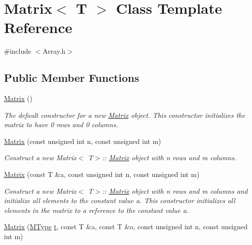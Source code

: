 \hypertarget{classMatrix}{}\section{Matrix$<$ T $>$ Class Template Reference}
\label{classMatrix}


{\ttfamily \#include $<$Array.\+h$>$}

\subsection*{Public Member Functions}
\begin{DoxyCompactItemize}
\item 
\mbox{\hyperlink{classMatrix_a9d567e3a121b1be0c3f9c461cab524fe}{Matrix}} ()
\begin{DoxyCompactList}\small\item\em The default constructor for a new \mbox{\hyperlink{classMatrix}{Matrix}} object. This constructor initializes the matrix to have 0 rows and 0 columns. \end{DoxyCompactList}\item 
\mbox{\hyperlink{classMatrix_ac8061527f81abb94e19b1ac6fd4af63a}{Matrix}} (const unsigned int n, const unsigned int m)
\begin{DoxyCompactList}\small\item\em Construct a new Matrix$<$ T$>$\+:\+: \mbox{\hyperlink{classMatrix}{Matrix}} object with {\ttfamily n} rows and {\ttfamily m} columns. \end{DoxyCompactList}\item 
\mbox{\hyperlink{classMatrix_a697e01f8d46c2059d0420d5b420efb91}{Matrix}} (const T \&a, const unsigned int n, const unsigned int m)
\begin{DoxyCompactList}\small\item\em Construct a new Matrix$<$ T$>$\+:\+: \mbox{\hyperlink{classMatrix}{Matrix}} object with {\ttfamily n} rows and {\ttfamily m} columns and initialize all elements to the constant value {\ttfamily a}. This constructor initializes all elements in the matrix to a reference to the constant value {\ttfamily a}. \end{DoxyCompactList}\item 
\mbox{\hyperlink{classMatrix_a991881e660607b10ff4fbf705006108d}{Matrix}} (\mbox{\hyperlink{Array_8h_afb4b79601b9f07458ff37d2c507b3e6d}{M\+Type}} \mbox{\hyperlink{Array_8h_a182b5b431d17bd072b8384e4ad728cf3}{t}}, const T \&a, const T \&o, const unsigned int n, const unsigned int m)

\end{DoxyCompactItemize}

